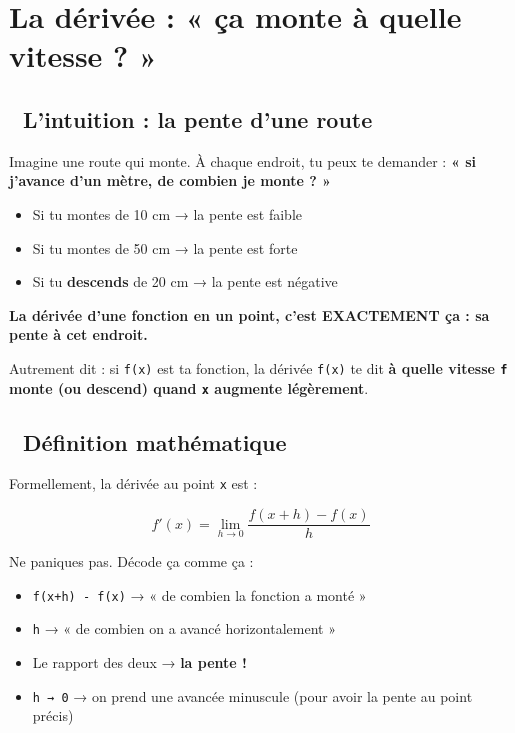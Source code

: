 \documentclass[
  french,
  11pt,
  a4paper,
]{scrbook}
\providecommand{\tightlist}{%
  \setlength{\itemsep}{0pt}\setlength{\parskip}{0pt}}
\begin{document}
\chapter{La dérivée : « ça monte à quelle vitesse ?
»}\label{la-duxe9rivuxe9e-uxe7a-monte-uxe0-quelle-vitesse}

\section{🎨 L'intuition : la pente d'une
route}\label{lintuition-la-pente-dune-route}

Imagine une route qui monte. À chaque endroit, tu peux te demander :
\textbf{« si j'avance d'un mètre, de combien je monte ? »}

\begin{itemize}
\tightlist
\item
  Si tu montes de 10 cm → la pente est faible
\item
  Si tu montes de 50 cm → la pente est forte
\item
  Si tu \textbf{descends} de 20 cm → la pente est négative
\end{itemize}

\textbf{La dérivée d'une fonction en un point, c'est EXACTEMENT ça : sa
pente à cet endroit.}

Autrement dit : si \texttt{f(x)} est ta fonction, la dérivée
\texttt{f\textquotesingle{}(x)} te dit \textbf{à quelle vitesse
\texttt{f} monte (ou descend) quand \texttt{x} augmente légèrement}.

\section{📐 Définition
mathématique}\label{duxe9finition-mathuxe9matique}

Formellement, la dérivée au point \texttt{x} est :

\[f'(x) = \lim_{h \to 0} \frac{f(x+h) - f(x)}{h}\]

Ne paniques pas. Décode ça comme ça :

\begin{itemize}
\tightlist
\item
  \texttt{f(x+h)\ -\ f(x)} → « de combien la fonction a monté »
\item
  \texttt{h} → « de combien on a avancé horizontalement »
\item
  Le rapport des deux → \textbf{la pente !}
\item
  \texttt{h\ →\ 0} → on prend une avancée minuscule (pour avoir la pente
  au point précis)
\end{itemize}
\end{document}

